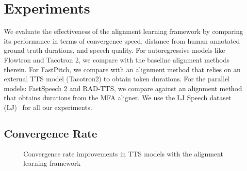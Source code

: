 \section{Experiments}
\label{sec:experiments}
We evaluate the effectiveness of the alignment learning framework by comparing its performance in terms of convergence speed, distance from human annotated ground truth durations, and speech quality. For autoregressive models like Flowtron and Tacotron 2, we compare with the baseline alignment methods therein. For FastPitch, we compare with an alignment method that relies on an external TTS model (Tacotron2) to obtain token durations. For the parallel models: FastSpeech 2 and RAD-TTS, we compare against an alignment method that obtains durations from the MFA aligner. We use the LJ Speech dataset (LJ)~\cite{LJS} for all our experiments. 

\subsection{Convergence Rate}
\begin{figure}[h]
    \begin{subfigure}{\linewidth}
    \label{fig:taco2_mcd}
    \hfill\hspace{1.0cm}
 \end{subfigure}
 \begin{subfigure}[t]{\linewidth}
     \label{fig:fta_mcd}
     \hfill\hspace{1.0cm}
 \end{subfigure}
 \begin{subfigure}[t]{\linewidth}
    \label{fig:rad_tts_mcd}
    \hfill\hspace{1.0cm}
 \end{subfigure}
  \begin{subfigure}[t]{\linewidth}
    \label{fig:fastpitch_mcd}
     \hfill\hspace{1.0cm}
 \end{subfigure}
 \begin{subfigure}[t]{\linewidth}
    \label{fig:fastspeech2_mcd}
    \hfill\hspace{1.0cm}
 \end{subfigure}
 \caption{Convergence rate improvements in TTS models with the alignment learning framework}
 \label{fig:mcd}
 \vspace*{-1\baselineskip}
\end{figure}

